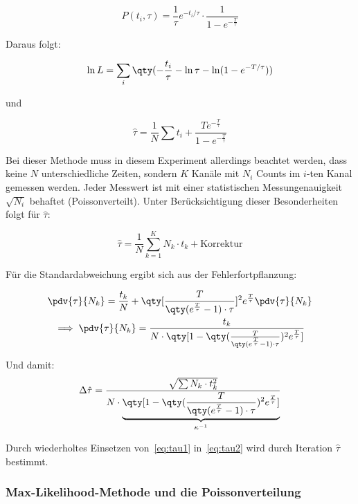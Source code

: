 \documentclass[slug=LM, room=Andreas-Schubert-Bau\,\ K\ 1A, supervisor=Anne-Sophie\ Berthold, coursedate=13.\ 12.\ 2019]{../../Lab_Report_LaTeX/lab_report}
\begin{document}
\begin{equation}\label{eq:modzerfall}
 P(t_i,\tau) = \frac{1}{\tau}e^{-t_i/\tau} \cdot \frac{1}{1-e^{-\frac{T}{\tau}}}
\end{equation}

Daraus folgt:

\begin{equation}\label{eq:delta-tau}
 \ln L = \sum_i \qty(-\frac{t_i}{\tau} - \ln\tau - \ln(1-e^{-T/\tau}))
\end{equation}

und

\begin{equation}\label{eq:tau2}
 \hat\tau = \frac{1}{N} \sum t_i + \frac{T e^{-\frac{T}{\tau}}}{1-e^{-\frac{T}{\tau}}}
\end{equation}

Bei dieser Methode muss in diesem Experiment allerdings beachtet
werden, dass keine \(N\) unterschiedliche Zeiten, sondern \(K\) Kanäle
mit \(N_i\) Counts im \(i\)-ten Kanal gemessen werden. Jeder Messwert
ist mit einer statistischen Messungenauigkeit \(\sqrt{N_i}\) behaftet
(Poissonverteilt).  Unter Berücksichtigung dieser Besonderheiten folgt
für \(\hat\tau\):

\begin{equation}\label{eq:tau1}
 \hat\tau = \frac{1}{N} \sum_{k=1}^{K}N_k\cdot t_k + \text{Korrektur}
\end{equation}

Für die Standardabweichung ergibt sich aus der Fehlerfortpflanzung:

\begin{gather}
  \pdv{\tau}{N_k} = \frac{t_k}{N} + \qty[\frac{T}{\qty(e^{\frac{T}{\tau}} -
    1)\cdot \tau}]^2e^{\frac{T}{\tau}}\pdv{\tau}{N_k} \\
  \implies \pdv{\tau}{N_k} = \frac{t_k}{N\cdot\qty[1 - \qty(\frac{T}{\qty(e^{\frac{T}{\tau}} -
    1)\cdot \tau})^2e^{\frac{T}{\tau}}]}
\end{gather}

Und damit:
\begin{equation}\label{eq:delta-tau-exp}
  \Delta \hat\tau = \frac{\sqrt{\sum N_k \cdot t_k^2}}{N\cdot\underbrace{\qty[1 - \qty(\frac{T}{\qty(e^{\frac{T}{\tau}} -
      1)\cdot \tau})^2e^{\frac{T}{\tau}}]}_{\kappa^{-1}}}
\end{equation}

Durch wiederholtes Einsetzen von~\ref{eq:tau1} in~\ref{eq:tau2} wird durch Iteration \(\hat\tau\)
bestimmt.

\subsubsection{Max-Likelihood-Methode und die Poissonverteilung}
\label{sec:likepoisson}
\end{document}

